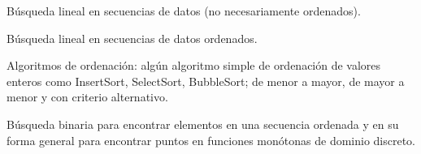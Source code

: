 \begin{itemize}
\item[\basic] Búsqueda lineal en secuencias de datos (no necesariamente ordenados).
\item[\basic] Búsqueda lineal en secuencias de datos ordenados.
\item[\advanced]
  Algoritmos de ordenación: algún algoritmo simple de ordenación de valores
  enteros como InsertSort, SelectSort, BubbleSort; de menor a mayor, de mayor a
  menor y con criterio alternativo.
{\new
\item[\advanced] Búsqueda binaria para encontrar elementos en una secuencia ordenada
  y en su forma general para encontrar puntos en funciones monótonas
  de dominio discreto.
}
\end{itemize}


